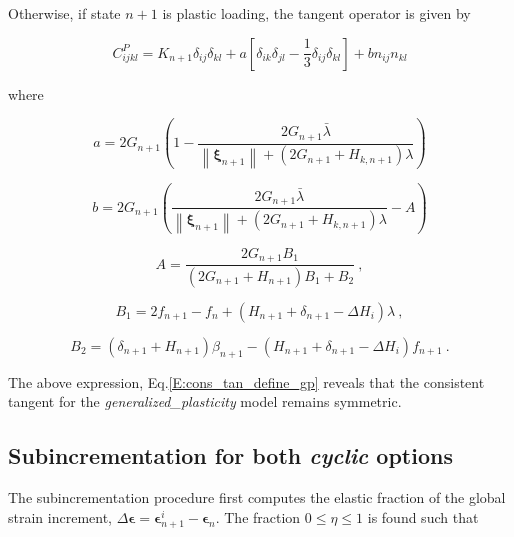 \documentclass[11pt]{report}
\numberwithin{equation}{section}
\newcommand{\bmf } {\boldsymbol }
\begin{document}
\noindent Otherwise, if state $n+1$ is plastic loading, the tangent operator is
given by

\begin{equation}\label{E:cons_tan_define_gp}
C_{ijkl}^P = K_{n+1}{\delta _{ij}}{\delta _{kl}} + a\left[ {{\delta _{ik}}{\delta _{jl}} -
\frac{1}{3}{\delta _{ij}}{\delta _{kl}}} \right] + b{n_{ij}}{n_{kl}} 
\end{equation}

\noindent where

\begin{equation}
a = 2G_{n+1}\left( {1 - \frac{{2G_{n+1}\bar \lambda }}{{\left\| 
{{\bmf{\xi }}_{n + 1}} \right\| + \left( 2 G_{n+1} + H_{k,n+1} \right) \lambda }}} \right)
\end{equation}

\begin{equation}
b = 2G_{n+1}\left( { \frac{{2G_{n+1}\bar \lambda }}{{\left\| 
{{\bmf{\xi }}_{n + 1}} \right\| + \left( 2 G_{n+1} + H_{k,n+1} \right) \lambda }} - A} \right)
\end{equation}

\begin{equation}
A = \dfrac{2 G_{n+1} B_1}{\left( 2 G_{n+1} + H_{n+1} \right) B_1 + B_2}~,
\end{equation}

\begin{equation}
B_1 = 2 f_{n+1} - f_n + \left( H_{n+1} + \delta_{n+1} - \Delta H_i \right) \lambda~,
\end{equation}

\begin{equation}
B_2 = \left( \delta_{n+1} + H_{n+1} \right) \beta_{n+1} - \left( H_{n+1} + \delta_{n+1} - \Delta H_i \right) f_{n+1}~.
\end{equation}

The above expression, Eq.\;\eqref {E:cons_tan_define_gp} reveals 
that the consistent tangent for the 
\textit{generalized\_plasticity} model remains symmetric.

\subsection {Subincrementation for both \textit{cyclic} options}

The subincrementation procedure first computes the elastic fraction of the 
global strain increment, $\Delta \bmf \epsilon = 
\bmf \epsilon^i_{n+1} -   \bmf \epsilon_n$. The fraction $0 \le \eta \le 1$
is found such that 
 
\end{document}

